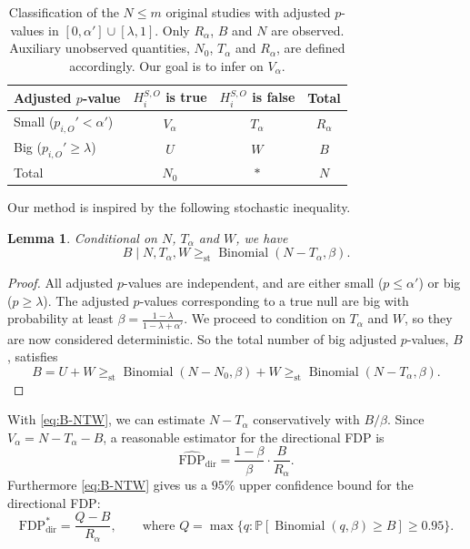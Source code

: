 \documentclass[11pt]{article}
\newtheorem{lemma}[corollary]{Lemma}
\theoremstyle{definition}
\theoremstyle{custom}
\newcommand{\PP}{\mathbb{P}}
\DeclareMathOperator{\Binomial}{Binomial}
\newcommand{\FDPd}{\text{FDP}_\text{dir}}
\newcommand{\hFDPd}{\widehat{\text{FDP}}_\text{dir}}
\newcommand{\gest}{\ge_\text{st}}
\begin{document}
  \begin{table}[htbp]
    \centering
    \begin{tabular}{lccc}
      \toprule
      Adjusted $p$-value & $H_i^{S,O}$ is true & $H_i^{S,O}$ is false & Total \\
      \midrule
      Small ($p_{i,O}' < \alpha'$) & $V_\alpha$ & $T_\alpha$ & $R_\alpha$ \\
      Big ($p_{i,O}' \ge \lambda$) & $U$ & $W$ & $B$ \\
      Total & $N_0$ & $*$ & $N$ \\
      \bottomrule
    \end{tabular}
    \caption{Classification of the $N \le m$ original studies with adjusted $p$-values in $[0, \alpha'] \cup [\lambda, 1]$. Only $R_\alpha$, $B$ and $N$ are observed. Auxiliary unobserved quantities, $N_0$, $T_\alpha$ and $R_\alpha$, are defined accordingly. Our goal is to infer on $V_\alpha$.}
    \label{tbl:big-small}
  \end{table}
  
  Our method is inspired by the following stochastic inequality.
  \begin{lemma}
    Conditional on $N$, $T_\alpha$ and $W$, we have
    \begin{equation}
      B \mid N, T_\alpha, W \gest \Binomial(N - T_\alpha, \beta).
    \label{eq:B-NTW}
    \end{equation}
  \end{lemma}
  \begin{proof}
    All adjusted $p$-values are independent, and are either small ($p \le \alpha'$) or big ($p \ge \lambda$). The adjusted $p$-values corresponding to a true null are big with probability at least $\beta = \frac{1 - \lambda}{1 - \lambda + \alpha'}$. We proceed to condition on $T_\alpha$ and $W$, so they are now considered deterministic. So the total number of big adjusted $p$-values, $B$, satisfies
    \[
      B = U + W \gest \Binomial(N-N_0, \beta) + W \gest \Binomial(N-T_\alpha, \beta).
    \]
  \end{proof}

  With \eqref{eq:B-NTW}, we can estimate $N - T_\alpha$ conservatively with $B / \beta$. Since $V_\alpha  = N - T_\alpha - B$, a reasonable estimator for the directional FDP is
  \[
    \hFDPd = \frac{1 - \beta}{\beta} \cdot \frac{B}{R_\alpha}.
  \]
  Furthermore \eqref{eq:B-NTW} gives us a $95\%$ upper confidence bound for the directional FDP:
  \[
    \FDPd^* = \frac{Q - B}{R_\alpha}, \qquad\text{where } Q = \max\{q: \PP[\Binomial(q, \beta) \ge B] \ge 0.95\}.
  \]
\end{document}
